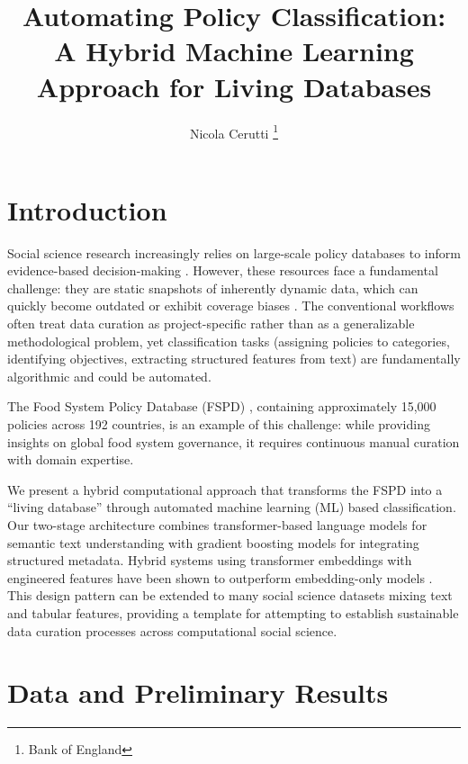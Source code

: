 \documentclass[a4paper,12pt]{article}
\title{Automating Policy Classification: A Hybrid Machine Learning Approach for Living Databases}
\date{}
\begin{document}
\maketitle
\thispagestyle{fancy}

\begin{center}
\author{Nicola Cerutti \footnote{Bank of England}}
\end{center}

\section*{Introduction}

Social science research increasingly relies on large-scale policy databases to inform evidence-based decision-making \cite{zanti2021evidence, yang2024evidence}. However, these resources face a fundamental challenge: they are static snapshots of inherently dynamic data, which can quickly become outdated or exhibit coverage biases \cite{szomszor2022overton}. The conventional workflows often treat data curation as project-specific rather than as a generalizable methodological problem, yet classification tasks (assigning policies to categories, identifying objectives, extracting structured features from text) are fundamentally algorithmic and could be automated.

The Food System Policy Database (FSPD) \cite{lowder2025}, containing approximately 15,000 policies across 192 countries, is an example of this challenge: while providing insights on global food system governance, it requires continuous manual curation with domain expertise.

We present a hybrid computational approach that transforms the FSPD into a ``living database'' through automated machine learning (ML) based classification. Our two-stage architecture combines transformer-based language models for semantic text understanding with gradient boosting models for integrating structured metadata. Hybrid systems using transformer embeddings with engineered features have been shown to outperform embedding-only models \cite{tian2023best, levy2022comparison}. This design pattern can be extended to many social science datasets mixing text and tabular features, providing a template for attempting to establish sustainable data curation processes across computational social science.

\section*{Data and Preliminary Results}
\end{document}
